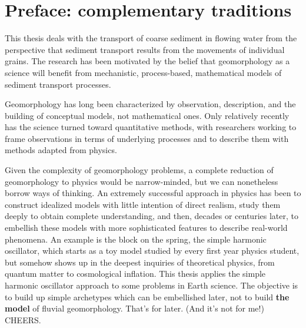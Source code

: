 
\chapter{Preface: complementary traditions}

This thesis deals with the transport of coarse sediment in flowing water from the perspective that sediment transport results from the movements of individual grains.
The research has been motivated by the belief that geomorphology as a science will benefit from mechanistic, process-based, mathematical models of sediment transport processes.

Geomorphology has long been characterized by observation, description, and the building of conceptual models, not mathematical ones.
Only relatively recently has the science turned toward quantitative methods, with researchers working to frame observations in terms of underlying processes and to describe them with methods adapted from physics.

Given the complexity of geomorphology problems, a complete reduction of geomorphology to physics would be narrow-minded, but we can nonetheless borrow ways of thinking.
An extremely successful approach in physics has been to construct idealized models with little intention of direct realism, study them deeply to obtain complete understanding, and then, decades or centuries later, to embellish these models with more sophisticated features to describe real-world phenomena.
An example is the block on the spring, the simple harmonic oscillator, which starts as a toy model studied by every first year physics student, but somehow shows up in the deepest inquiries of theoretical physics, from quantum matter to cosmological inflation.
This thesis applies the simple harmonic oscillator approach to some problems in Earth science.
The objective is to build up simple archetypes which can be embellished later, not to build \textbf{the model} of fluvial geomorphology. 
That's for later. (And it's not for me!) CHEERS.
